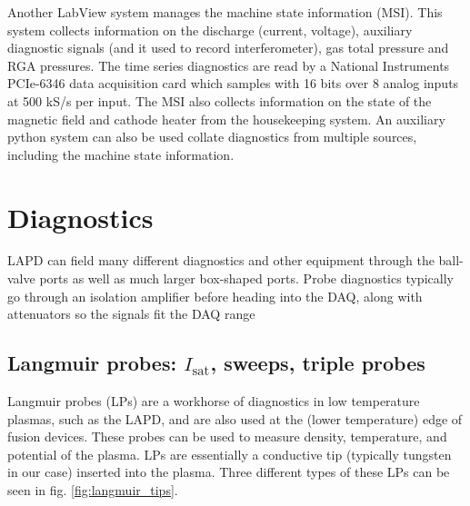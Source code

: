 Another LabView system manages the machine state information (MSI). This system collects information on the discharge (current, voltage), auxiliary diagnostic signals (and it used to record interferometer), gas total pressure and RGA pressures. The time series diagnostics are read by a National Instruments PCIe-6346 data acquisition card which samples with 16 bits over 8 analog inputs at 500 kS/s per input. The MSI also collects information on the state of the magnetic field and cathode heater from the housekeeping system. An auxiliary python system can also be used collate diagnostics from multiple sources, including the machine state information.

\section{Diagnostics}

LAPD can field many different diagnostics and other equipment through the ball-valve ports as well as much larger box-shaped ports.
Probe diagnostics typically go through an isolation amplifier before heading into the DAQ, along with attenuators so the signals fit the DAQ range

\subsection{Langmuir probes: $I_\text{sat}$, sweeps, triple probes}

Langmuir probes (LPs) are a workhorse of diagnostics in low temperature plasmas, such as the LAPD, and are also used at the (lower temperature) edge of fusion devices. These probes can be used to measure density, temperature, and potential of the plasma. LPs are essentially a conductive tip (typically tungsten in our case) inserted into the plasma. Three different types of these LPs can be seen in fig. \ref{fig:langmuir_tips}. 

